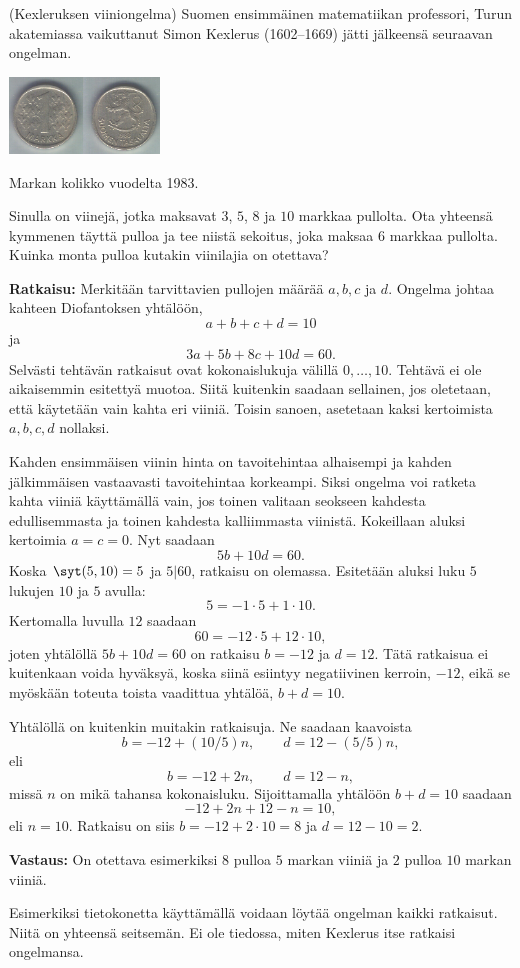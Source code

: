 \begin{esimerkki}
 (Kexleruksen viiniongelma)
Suomen ensimmäinen matematiikan professori, Turun
akatemiassa vaikuttanut Simon Kexlerus (1602--1669) jätti
jälkeensä seuraavan ongelman.

\medskip

\begin{center}
\includegraphics[width=4cm]{pictures/wikimarkka.jpg}

Markan kolikko vuodelta 1983.
\end{center}

\medskip

Sinulla on viinejä, jotka maksavat $3$, $5$, $8$ ja $10$
markkaa pullolta. Ota yhteensä kymmenen täyttä pulloa ja
tee niistä sekoitus, joka maksaa $6$ markkaa pullolta.
Kuinka monta pulloa kutakin viinilajia on otettava?

{\bf Ratkaisu:} Merkitään tarvittavien pullojen määrää
$a,b,c$ ja $d$. Ongelma johtaa kahteen Diofantoksen
yhtälöön,
\[
a+b+c+d = 10
\]
ja
\[
3a+5b+8c+10d = 60.
\]
Selvästi tehtävän ratkaisut ovat kokonaislukuja välillä
$0,\ldots,10$. Tehtävä ei ole aikaisemmin esitettyä
muotoa. Siitä kuitenkin saadaan sellainen, jos oletetaan,
että käytetään vain kahta eri viiniä. Toisin sanoen,
asetetaan kaksi kertoimista $a,b,c,d$ nollaksi.

Kahden ensimmäisen viinin hinta on tavoitehintaa
alhaisempi ja kahden jälkimmäisen vastaavasti
tavoitehintaa korkeampi. Siksi ongelma voi ratketa kahta
viiniä käyttämällä vain, jos toinen valitaan seokseen
kahdesta edullisemmasta ja toinen kahdesta kalliimmasta
viinistä. Kokeillaan aluksi kertoimia $a=c=0$. Nyt
saadaan
\[
5b + 10d = 60.
\]
Koska $\syt(5,10)=5$ ja $5|60$, ratkaisu on olemassa.
Esitetään aluksi luku $5$ lukujen $10$ ja $5$ avulla:
\[
5 = -1 \cdot 5 + 1\cdot 10.
\]
Kertomalla luvulla $12$ saadaan
\[
60 = -12\cdot 5 + 12\cdot 10,
\]
joten yhtälöllä $5b+10d=60$ on ratkaisu $b=-12$ ja $d=12$. Tätä ratkaisua ei kuitenkaan voida hyväksyä, koska siinä esiintyy negatiivinen kerroin, $-12$, eikä se myöskään toteuta toista vaadittua yhtälöä, $b+d=10$.

Yhtälöllä on kuitenkin muitakin ratkaisuja. Ne saadaan
kaavoista
\[
b= -12 + (10/5)n, \qquad d=12 - (5/5)n,
\]
eli
\[
b= -12 + 2n, \qquad d=12 - n,
\]
missä $n$ on mikä tahansa kokonaisluku. Sijoittamalla
yhtälöön $b+d=10$ saadaan
\[
-12 + 2n + 12 - n = 10,
\]
eli $n=10$. Ratkaisu on siis $b=-12+2 \cdot 10=8$ ja
$d=12-10=2$.

{\bf Vastaus:} On otettava esimerkiksi $8$ pulloa $5$
markan viiniä ja $2$ pulloa $10$ markan viiniä.

Esimerkiksi tietokonetta käyttämällä voidaan löytää
ongelman kaikki ratkaisut. Niitä on yhteensä seitsemän.
Ei ole tiedossa, miten Kexlerus itse ratkaisi ongelmansa.
\end{esimerkki}

